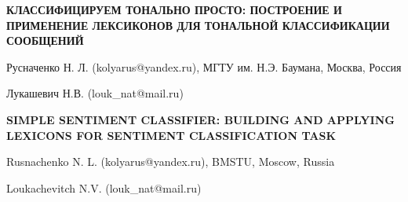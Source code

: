 \documentclass[a4paper,11pt]{extarticle}
\begin{document}
    \newcommand\twitter{{\it Twitter }}

    \begin{center}
        \bf
        КЛАССИФИЦИРУЕМ ТОНАЛЬНО ПРОСТО: ПОСТРОЕНИЕ И ПРИМЕНЕНИЕ ЛЕКСИКОНОВ ДЛЯ
        ТОНАЛЬНОЙ КЛАССИФИКАЦИИ СООБЩЕНИЙ
    \end{center}
    \begin{center}
        Русначенко Н. Л. (kolyarus@yandex.ru),
        МГТУ им. Н.Э. Баумана, Москва, Россия

        Лукашевич Н.В. (louk\_nat@mail.ru)
    \end{center}
    \begin{center}
        \bf
        SIMPLE SENTIMENT CLASSIFIER: BUILDING AND APPLYING LEXICONS FOR SENTIMENT
        CLASSIFICATION TASK
    \end{center}
    \begin{center}
        Rusnachenko N. L. (kolyarus@yandex.ru), BMSTU, Moscow, Russia

        Loukachevitch N.V. (louk\_nat@mail.ru)
    \end{center}


    

    

    

    

    

    

    

    

    

    \clearpage
    \newpage
\end{document}
